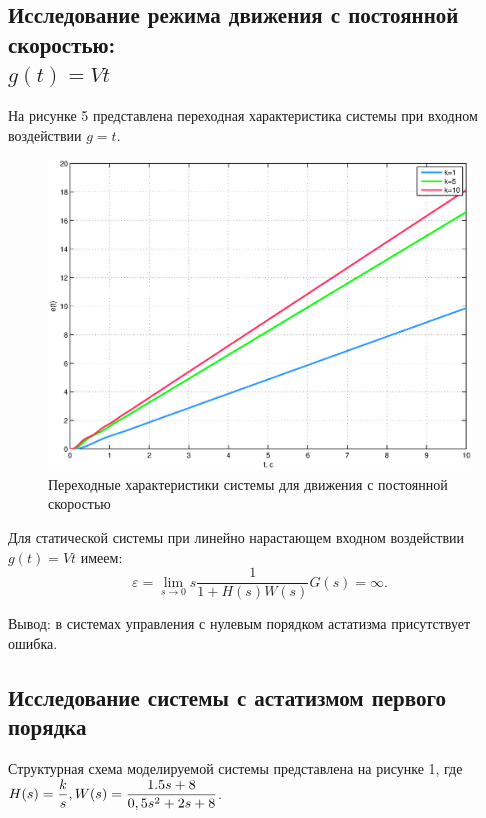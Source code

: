 \documentclass[12pt,a4paper]{article}
\begin{document}
\subsection{Исследование режима движения с постоянной скоростью: \\$g(t)=Vt$} 
На рисунке 5 представлена переходная характеристика системы при входном воздействии $g=t$.
\begin{figure}[H]
	\centering
	\includegraphics[width=0.8\linewidth]{scheme/plot3.eps}
	\caption{Переходные характеристики системы для движения с постоянной скоростью}
\end{figure}
Для статической системы при линейно нарастающем входном воздействии $g(t)=Vt$ имеем:
\begin{equation}
    \varepsilon = \lim_{s\to0} s\frac{1}{1+H(s)W(s)}G(s) = \infty.
\end{equation}\par
Вывод: в системах управления с нулевым порядком астатизма присутствует ошибка.
\newpage
\begin{center}
\section{Исследование системы с астатизмом первого порядка}
\end{center}\par
Структурная схема моделируемой системы представлена на рисунке 1, где $H(s) = \displaystyle{\frac{k}{s}},\\W(s)=\displaystyle{\frac{1.5s+8}{0,5s^2+2s+8}}$.
\end{document}
